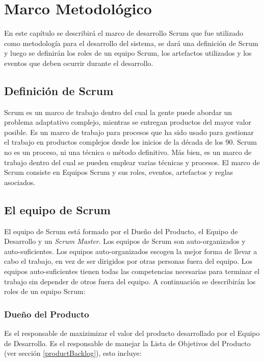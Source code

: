 \chapter{Marco Metodológico} \label{marcoMetodologico}

En este capítulo se describirá el marco de desarrollo Scrum que fue utilizado como metodología para el desarrollo del sistema, se dará una definición de Scrum y luego se definirán los roles de un equipo Scrum, los artefactos utilizados y los eventos que deben ocurrir durante el desarrollo.

\section{Definición de Scrum}
Scrum es un marco de trabajo dentro del cual la gente puede abordar un problema adaptativo complejo, mientras se entregan productos del mayor valor posible. Es un marco de trabajo para procesos que ha sido usado para gestionar el trabajo en productos complejos desde los inicios de la década de los 90. Scrum no es un proceso, ni una técnica o método definitivo. Más bien, es un marco de trabajo dentro del cual se pueden emplear varias técnicas y procesos. El marco de Scrum consiste en Equipos Scrum y sus roles, eventos, artefactos y reglas asociados. \cite{scrumSchwaber}

\section{El equipo de Scrum}
El equipo de Scrum está formado por el Dueño del Producto, el Equipo de Desarrollo y un \emph{Scrum Master}. Los equipos de Scrum son auto-organizados y auto-suficientes. Los equipos auto-organizados escogen la mejor forma de llevar a cabo el trabajo, en vez de ser dirigidos por otras personas fuera del equipo. Los equipos auto-suficientes tienen todas las competencias necesarias para terminar el trabajo sin depender de otros fuera del equipo. \cite{scrumSchwaber} A continuación se describirán los roles de un equipo Scrum:

\subsection{Dueño del Producto} \label{productOwner}
Es el responsable de maxizimizar el valor del producto desarrollado por el Equipo de Desarrollo. Es el responsable de manejar la Lista de Objetivos del Producto (ver sección \ref{productBacklog}), esto incluye:

